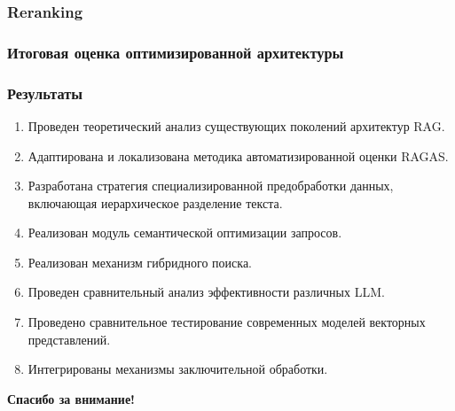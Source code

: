 \documentclass[aspectratio=169, xcolor={table}, usepdftitle=false]{beamer} %
\begin{document}
\begin{frame}
\frametitle{Reranking}
\begin{center}
\end{center}
\end{frame}

\begin{frame}
\frametitle{Итоговая оценка оптимизированной архитектуры}
\begin{center}
\end{center}
\end{frame}

\begin{frame}
\frametitle{Результаты}
\small
\begin{enumerate}
    \item Проведен теоретический анализ существующих поколений архитектур RAG.
    \item Адаптирована и локализована методика автоматизированной оценки RAGAS.
    \item Разработана стратегия специализированной предобработки данных, включающая иерархическое разделение текста.
    \item Реализован модуль семантической оптимизации запросов.
    \item Реализован механизм гибридного поиска.
    \item Проведен сравнительный анализ эффективности различных LLM.
    \item Проведено сравнительное тестирование современных моделей векторных представлений.
    \item Интегрированы механизмы заключительной обработки.
\end{enumerate}
\end{frame}

\begin{frame}
\vspace{2cm}
\centering
\Huge \textbf{Спасибо за внимание!}
\end{frame}
\end{document}
